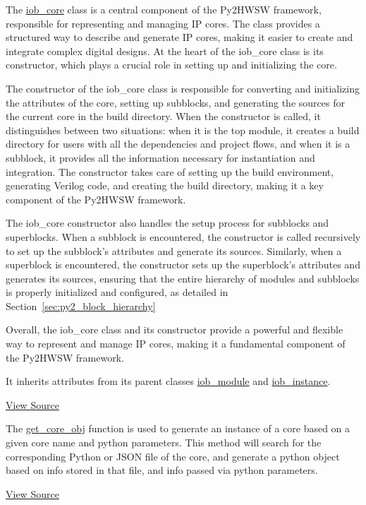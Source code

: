 %

The \href{https://github.com/IObundle/py2hwsw/blob/main/py2hwsw/scripts/iob_core.py}{iob\_core} class is a central component of the Py2HWSW framework, responsible for representing and managing IP cores. The class provides a structured way to describe and generate IP cores, making it easier to create and integrate complex digital designs. At the heart of the iob\_core class is its constructor, which plays a crucial role in setting up and initializing the core.

The constructor of the iob\_core class is responsible for converting and initializing the attributes of the core, setting up subblocks, and generating the sources for the current core in the build directory. When the constructor is called, it distinguishes between two situations: when it is the top module, it creates a build directory for users with all the dependencies and project flows, and when it is a subblock, it provides all the information necessary for instantiation and integration. The constructor takes care of setting up the build environment, generating Verilog code, and creating the build directory, making it a key component of the Py2HWSW framework.

The iob\_core constructor also handles the setup process for subblocks and superblocks. When a subblock is encountered, the constructor is called recursively to set up the subblock's attributes and generate its sources. Similarly, when a superblock is encountered, the constructor sets up the superblock's attributes and generates its sources, ensuring that the entire hierarchy of modules and subblocks is properly initialized and configured, as detailed in Section~\ref{sec:py2_block_hierarchy}

Overall, the iob\_core class and its constructor provide a powerful and flexible way to represent and manage IP cores, making it a fundamental component of the Py2HWSW framework.

It inherits attributes from its parent classes \href{https://github.com/IObundle/py2hwsw/blob/main/py2hwsw/scripts/iob_module.py}{iob\_module} and \href{https://github.com/IObundle/py2hwsw/blob/main/py2hwsw/scripts/iob_instance.py}{iob\_instance}.


\href{https://github.com/IObundle/py2hwsw/blob/main/py2hwsw/scripts/iob_core.py}{View Source}


The \href{https://github.com/IObundle/py2hwsw/blob/main/py2hwsw/scripts/iob_core.py#L858}{get\_core\_obj} function is used to generate an instance of a core based on a given core name and python parameters.
This method will search for the corresponding Python or JSON file of the core, and generate a python object based on info stored in that file, and info passed via python parameters.


\href{https://github.com/IObundle/py2hwsw/blob/main/py2hwsw/scripts/iob_core.py}{View Source}
